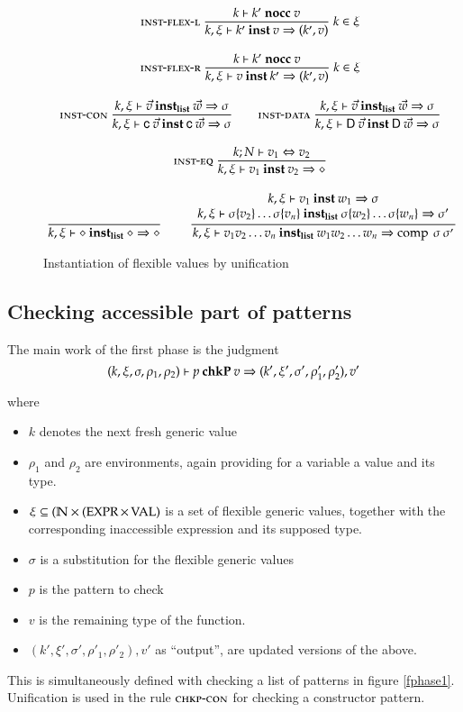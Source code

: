 \begin{figure}[htp]
\begin{gather*}
\mbox{\sc inst-flex-l}\ \dfrac{k\vdash k'\mbox{ \textbf{nocc} }v}{k,\xi\vdash k'\:\mathbf{inst}\:v\Rightarrow (k',v)}
{\; k \in \xi }
\\[2ex]
\mbox{\sc inst-flex-r}\ \dfrac{k\vdash k'\mbox{ \textbf{nocc} }v}{k,\xi\vdash v\:\mathbf{inst}\:k'\Rightarrow (k',v)}
{\; k \in \xi}
\\[2ex]
\mbox{\sc inst-con}\ \dfrac{{k,\xi\vdash\vec{v}\:\mathbf{inst_{list}}\:\vec{w}\Rightarrow \sigma}}{k,\xi\vdash\mathsf{c} \: \vec{v}\:\mathbf{inst}\:\mathsf{c} \: \vec{w}\Rightarrow \sigma
}
\qquad
\mbox{\sc inst-data}\ \dfrac{{k,\xi\vdash\vec{v}\:\mathbf{inst_{list}}\:\vec{w}\Rightarrow \sigma}}{k,\xi\vdash\mathsf{D} \: \vec{v}\:\mathbf{inst}\:\mathsf{D} \: \vec{w}\Rightarrow \sigma
}
\\[2ex]
\mbox{\sc inst-eq}\ \dfrac{k;N\vdash v_1\Leftrightarrow v_2}{k,\xi\vdash v_1\:\mathbf{inst}\:v_2\Rightarrow \diamond
}
\\[2ex]
\ \dfrac{}{k,\xi\vdash\diamond\:\mathbf{inst_{list}}\:\diamond\Rightarrow \diamond}
\qquad
\ \dfrac{\begin{array}[b]{c}k,\xi\vdash v_1\:\mathbf{inst}\:w_1\Rightarrow \sigma\\k,\xi\vdash\sigma\{v_2\} \ldots \sigma\{v_n\}\:\mathbf{inst_{list}}\:\sigma\{w_2\} \ldots \sigma\{w_n\}\Rightarrow \sigma'\end{array}}{k,\xi\vdash v_1 v_2 \ldots v_n\:\mathbf{inst_{list}}\:w_1 w_2 \ldots w_n\Rightarrow \operatorname{comp}\:\sigma\:\sigma'}
\end{gather*}
\caption{Instantiation of flexible values by unification}
\label{finst}
\end{figure}

\subsection{Checking accessible part of patterns}

The main work of the first phase is the judgment 
\[
(k,\xi,\sigma,\rho_1,\rho_2)\vdash p\:\mathbf{chkP}\:v\Rightarrow (k',\xi',\sigma',\rho'_1,\rho'_2),v'
\]

where
\begin{itemize}
\item
$k$ denotes the next fresh generic value
\item
$\rho_1$ and $\rho_2$ are environments, again providing for a variable a value and its type.
\item
$\xi \subseteq (\mathbb{N} \times (\operatorname{EXPR} \times \operatorname{VAL})$ is a set of flexible generic values, together with the corresponding inaccessible expression and its supposed type.
\item
$\sigma$ is a substitution for the flexible generic values
\item
$p$ is the pattern to check
\item
$v$ is the remaining type of the function.
\item
$(k',\xi',\sigma',\rho'_1,\rho'_2),v'$ as ``output'', are updated versions of the above.
\end{itemize}
This is simultaneously defined with checking a list of patterns in figure \ref{fphase1}. 
Unification is used in the rule $\mbox{\sc chkp-con}$ for checking a constructor pattern.


